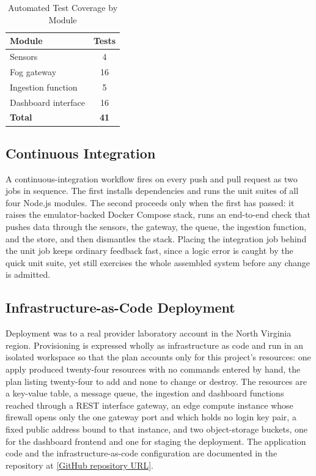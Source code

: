 \documentclass[conference]{IEEEtran}
\begin{document}
\begin{table}[!t]
\caption{Automated Test Coverage by Module}
\label{tab:tests}
\centering
\renewcommand{\arraystretch}{1.3}
\begin{tabular}{@{}lc@{}}
\toprule
\textbf{Module} & \textbf{Tests} \\
\midrule
Sensors & 4 \\
Fog gateway & 16 \\
Ingestion function & 5 \\
Dashboard interface & 16 \\
\midrule
\textbf{Total} & \textbf{41} \\
\bottomrule
\end{tabular}
\end{table}

\subsection{Continuous Integration}

A continuous-integration workflow fires on every push and pull request as two jobs in sequence. The first installs dependencies and runs the unit suites of all four Node.js modules. The second proceeds only when the first has passed: it raises the emulator-backed Docker Compose stack, runs an end-to-end check that pushes data through the sensors, the gateway, the queue, the ingestion function, and the store, and then dismantles the stack. Placing the integration job behind the unit job keeps ordinary feedback fast, since a logic error is caught by the quick unit suite, yet still exercises the whole assembled system before any change is admitted.

\subsection{Infrastructure-as-Code Deployment}

Deployment was to a real provider laboratory account in the North Virginia region. Provisioning is expressed wholly as infrastructure as code and run in an isolated workspace so that the plan accounts only for this project's resources: one apply produced twenty-four resources with no commands entered by hand, the plan listing twenty-four to add and none to change or destroy. The resources are a key-value table, a message queue, the ingestion and dashboard functions reached through a REST interface gateway, an edge compute instance whose firewall opens only the one gateway port and which holds no login key pair, a fixed public address bound to that instance, and two object-storage buckets, one for the dashboard frontend and one for staging the deployment. The application code and the infrastructure-as-code configuration are documented in the repository at \href{[GitHub repository URL]}{[GitHub repository URL]}.
\end{document}

